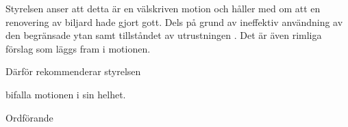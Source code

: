 \documentclass[../_main/handlingar.tex]{subfiles}
\begin{document}
\motionssvar


Styrelsen anser att detta är en välskriven motion och håller med om att en renovering av biljard hade gjort gott. Dels på grund av ineffektiv användning av den begränsade ytan samt tillståndet av utrustningen . Det är även rimliga förslag som läggs fram i motionen. 



Därför rekommenderar styrelsen
\begin{attsatser}
    \att bifalla motionen i sin helhet.
\end{attsatser}

\begin{signatures}{1}
    \ist
    \signature{\ordf}{Ordförande}
\end{signatures}
\end{document}
